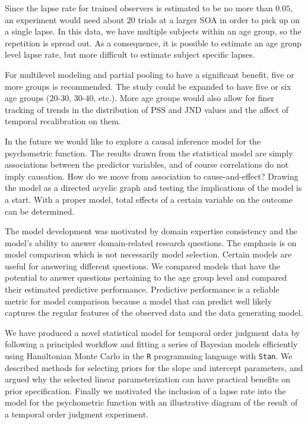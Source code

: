 \documentclass[11pt, oneside, openany]{scrbook}
\begin{document}
Since the lapse rate for trained observers is estimated to be no more than \(0.05\), an experiment would need about \(20\) trials at a larger SOA in order to pick up on a single lapse. In this data, we have multiple subjects within an age group, so the repetition is spread out. As a consequence, it is possible to estimate an age group level lapse rate, but more difficult to estimate subject specific lapses.

For multilevel modeling and partial pooling to have a significant benefit, five or more groups is recommended. The study could be expanded to have five or six age groups (20-30, 30-40, etc.). More age groups would also allow for finer tracking of trends in the distribution of PSS and JND values and the affect of temporal recalibration on them.

In the future we would like to explore a causal inference model for the psychometric function. The results drawn from the statistical model are simply associations between the predictor variables, and of course correlations do not imply causation. How do we move from association to cause-and-effect? Drawing the model as a directed acyclic graph and testing the implications of the model is a start. With a proper model, total effects of a certain variable on the outcome can be determined.

The model development was motivated by domain expertise consistency and the model's ability to answer domain-related research questions. The emphasis is on model comparison which is not necessarily model selection. Certain models are useful for answering different questions. We compared models that have the potential to answer questions pertaining to the age group level and compared their estimated predictive performance. Predictive performance is a reliable metric for model comparison because a model that can predict well likely captures the regular features of the observed data and the data generating model.

We have produced a novel statistical model for temporal order judgment data by following a principled workflow and fitting a series of Bayesian models efficiently using Hamiltonian Monte Carlo in the \texttt{R} programming language with \texttt{Stan}. We described methods for selecting priors for the slope and intercept parameters, and argued why the selected linear parameterization can have practical benefits on prior specification. Finally we motivated the inclusion of a lapse rate into the model for the psychometric function with an illustrative diagram of the result of a temporal order judgment experiment.
\end{document}
